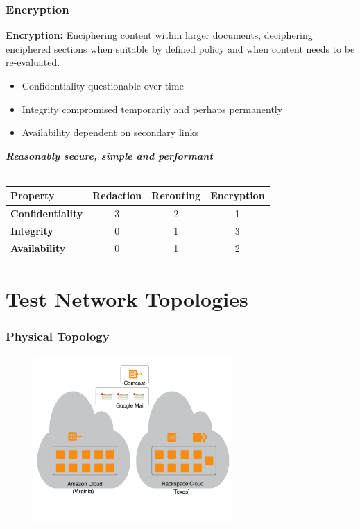 \documentclass[t,handout]{beamer}
\begin{document}
\begin{frame}
\frametitle{Encryption}
{\bf Encryption:} {\small Enciphering content within larger documents, deciphering enciphered sections when suitable by defined policy and when content needs to be re-evaluated.} \\
\begin{itemize}
\item {\small Confidentiality questionable over time}
\item {\small Integrity compromised temporarily and perhaps permanently}
\item {\small Availability dependent on secondary links}
\end{itemize}
\begin{center}
{\bf \textit{Reasonably secure, simple and performant}}
\\~\\
\begin{small}
\begin{tabular}{lccc}
\toprule %
{\bf Property}			& {\bf Redaction}	& {\bf Rerouting} 	& {\bf Encryption} 	\\\toprule
{\bf Confidentiality} 	& 3				  	& 2					& 1				 	\\\midrule
{\bf Integrity}			& 0					& 1					& 3 					\\\midrule
{\bf Availability}		& 0					& 1					& 2					\\\bottomrule
\end{tabular}
\end{small}
\end{center}
\end{frame}

\section{Test Network Topologies}

\begin{frame}
\frametitle{Physical Topology}
\begin{figure}[!t]
\centering
\includegraphics[width=3in]{physical-clouds}
\end{figure}
\end{frame}
\end{document}
